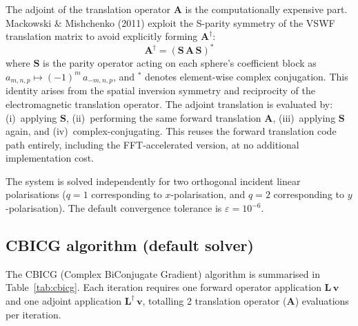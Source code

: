 \documentclass[11pt,a4paper]{article}
\begin{document}
The adjoint of the translation operator $\mathbf{A}$ is the computationally expensive part.
Mackowski \& Mishchenko (2011) exploit the S-parity symmetry of the VSWF translation matrix to avoid explicitly forming $\mathbf{A}^\dagger$:
\begin{equation}
  \mathbf{A}^\dagger = \left(\mathbf{S}\,\mathbf{A}\,\mathbf{S}\right)^*
  \label{eq:adjoint-symmetry}
\end{equation}
where $\mathbf{S}$ is the parity operator acting on each sphere's coefficient block as $a_{m,n,p} \mapsto (-1)^m\,a_{-m,n,p}$, and ${}^*$ denotes element-wise complex conjugation.
This identity arises from the spatial inversion symmetry and reciprocity of the electromagnetic translation operator.
The adjoint translation is evaluated by: (i)~applying $\mathbf{S}$, (ii)~performing the same forward translation $\mathbf{A}$, (iii)~applying $\mathbf{S}$ again, and (iv)~complex-conjugating.
This reuses the forward translation code path entirely, including the FFT-accelerated version, at no additional implementation cost.

The system is solved independently for two orthogonal incident linear polarisations ($q = 1$ corresponding to $x$-polarisation, and $q = 2$ corresponding to $y$-polarisation).
The default convergence tolerance is $\varepsilon = 10^{-6}$.

\subsection{CBICG algorithm (default solver)}

The CBICG (Complex BiConjugate Gradient) algorithm is summarised in Table~\ref{tab:cbicg}.  Each iteration requires one forward operator application $\mathbf{L}\,\bm{v}$ and one adjoint application $\mathbf{L}^\dagger\,\bm{v}$, totalling 2 translation operator ($\mathbf{A}$) evaluations per iteration.
\end{document}
